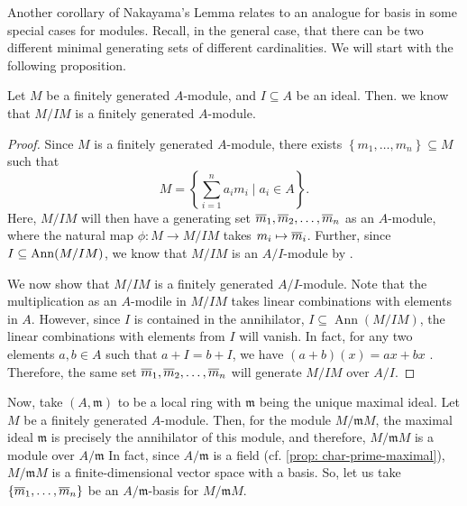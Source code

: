 Another corollary of Nakayama's Lemma relates to an analogue for basis in some special cases for modules. Recall, in the general case, that there can be two different minimal generating sets of different cardinalities. We will start with the following proposition.
\begin{proposition}
    Let $M$ be a finitely generated $A$-module, and $I \subseteq A$ be an ideal. Then. we know that $M / I M$ is a finitely generated $A$-module.
\end{proposition}
\begin{proof}
    Since $M$ is a finitely generated $A$-module, there exists $\left\{m_{1}, \ldots, m_{n}\right\} \subseteq M$ such that
    \[
    M=\left\{\sum_{i=1}^{n} a_{i} m_{i} \mid a_{i} \in A\right\}.
    \] 
    Here, $M/IM$ will then have a generating set $\ol{m}_{1}, \ol{m}_{2}, \ldots, \ol{m}_{n}$ as an $A$-module, where the natural map $\phi : M \to M/IM$ takes $m_i \mapsto \ol{m}_i$. Further, since $I \ss \operatorname{Ann}(M/IM)$, we know that $M/IM$ is an $A/I$-module by \REF.

    We now show that $M / I M$ is a finitely generated $A / I$-module. 
    Note that the multiplication as an $A$-modile in $M/IM$ takes linear combinations with elements in $A$. However, since $I$ is contained in the annihilator, $I \subseteq \operatorname{Ann}(M / I M)$, the linear combinations with elements from $I$ will vanish. In fact, for any two elements $a,b \in A$ such that $a+I = b+I$, we have 
    $(a+b)(x) = ax + bx$
    . Therefore, the same set $\ol{m}_{1}, \ol{m}_{2}, \ldots, \ol{m}_{n}$ will generate $M / I M$ over $A / I$. 
\end{proof}

Now, take $(A, \mathfrak{m})$ to be a local ring with $\mathfrak{m}$ being the unique maximal ideal. Let $M$ be a finitely generated $A$-module. Then, for the module $M / \mathfrak{m} M$, the maximal ideal $\mathfrak{m}$ is precisely the annihilator of this module, and therefore, $M / \mathfrak{m} M$ is a module over $A / \mathfrak{m}$ In fact, since $A / \mathfrak{m}$ is a field (cf. \cref{prop: char-prime-maximal}), $M / \mathfrak{m} M$ is a finite-dimensional vector space with a basis. So, let us take $\left\{\ol{m}_{1}, \ldots, \ol{m}_{n}\right\}$ be an $A / \mathfrak{m}$-basis for $M / \mathfrak{m} M$.

